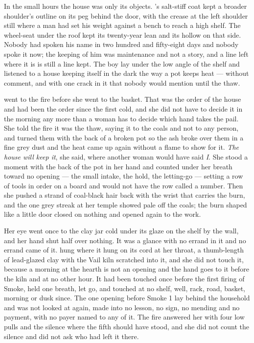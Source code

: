 In the small hours the house was only its objects. 's salt-stiff coat kept a broader shoulder's outline on its peg behind the door, with the crease at the left shoulder still where a man had set his weight against a bench to reach a high shelf. The wheel-seat under the roof kept its twenty-year lean and its hollow on that side. Nobody had spoken his name in two hundred and fifty-eight days and nobody spoke it now; the keeping of him was maintenance and not a story, and a line left where it is is still a line kept. The boy lay under the low angle of the shelf and listened to a house keeping itself in the dark the way a pot keeps heat --- without comment, and with one crack in it that nobody would mention until the thaw.

\scenebreak

 went to the fire before she went to the basket. That was the order of the house and had been the order since the first cold, and she did not have to decide it in the morning any more than a woman has to decide which hand takes the pail. She told the fire it was the thaw, saying it to the coals and not to any person, and turned them with the back of a broken pot so the ash broke over them in a fine grey dust and the heat came up again without a flame to show for it. \emph{The house will keep it}, she said, where another woman would have said \emph{I}. She stood a moment with the back of the pot in her hand and counted under her breath toward no opening --- the small intake, the hold, the letting-go --- setting a row of tools in order on a board and would not have the row called a number. Then she pushed a strand of coal-black hair back with the wrist that carries the burn, and the one grey streak at her temple showed pale off the coals; the burn shaped like a little door closed on nothing and opened again to the work.

Her eye went once to the clay jar cold under its glaze on the shelf by the wall, and her hand shut half over nothing. It was a glance with no errand in it and no errand came of it.  hung where it hung on its cord at her throat, a thumb-length of lead-glazed clay with the Vail kiln scratched into it, and she did not touch it, because a morning at the hearth is not an opening and the hand goes to it before the kiln and at no other hour. It had been touched once before the first firing of Smoke, held one breath, let go, and touched at no shelf, well, rack, road, basket, morning or dusk since. The one opening before Smoke 1 lay behind the household and was not looked at again, made into no lesson, no sign, no mending and no payment, with no payer named to any of it. The fire answered her with four low pulls and the silence where the fifth should have stood, and she did not count the silence and did not ask who had left it there.

